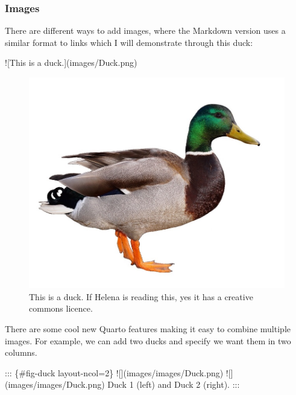 \documentclass[
  letterpaper,
  DIV=11,
  numbers=noendperiod]{scrreprt}
\newenvironment{Shaded}{\begin{snugshade}}{\end{snugshade}}
\newcommand{\CommentTok}[1]{\textcolor[rgb]{0.37,0.37,0.37}{#1}}
\newcommand{\DecValTok}[1]{\textcolor[rgb]{0.68,0.00,0.00}{#1}}
\newcommand{\NormalTok}[1]{\textcolor[rgb]{0.00,0.23,0.31}{#1}}
\newcommand{\SpecialCharTok}[1]{\textcolor[rgb]{0.37,0.37,0.37}{#1}}
\begin{document}
\subsubsection{Images}\label{images}

There are different ways to add images, where the Markdown version uses
a similar format to links which I will demonstrate through this duck:

\begin{Shaded}
\begin{Highlighting}[]
\SpecialCharTok{!}\NormalTok{[This is a duck.](images}\SpecialCharTok{/}\NormalTok{Duck.png)}
\end{Highlighting}
\end{Shaded}

\begin{figure}[H]

{\centering \includegraphics{images/Duck.png}

}

\caption{This is a duck. If Helena is reading this, yes it has a
creative commons licence.}

\end{figure}%

There are some cool new Quarto features making it easy to combine
multiple images. For example, we can add two ducks and specify we want
them in two columns.

\begin{Shaded}
\begin{Highlighting}[]
\SpecialCharTok{:::}\NormalTok{ \{}\CommentTok{\#fig{-}duck layout{-}ncol=2\}}
\SpecialCharTok{!}\NormalTok{[](images}\SpecialCharTok{/}\NormalTok{images}\SpecialCharTok{/}\NormalTok{Duck.png)}
\SpecialCharTok{!}\NormalTok{[](images}\SpecialCharTok{/}\NormalTok{images}\SpecialCharTok{/}\NormalTok{Duck.png)}
\NormalTok{Duck }\DecValTok{1}\NormalTok{ (left) and Duck }\DecValTok{2}\NormalTok{ (right). }
\SpecialCharTok{:::}
\end{Highlighting}
\end{Shaded}
\end{document}
